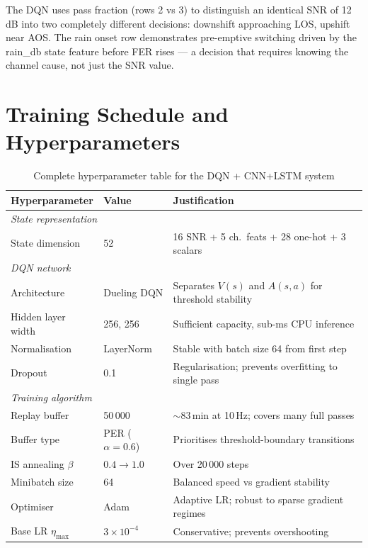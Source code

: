 \documentclass[12pt,a4paper]{report}
\begin{document}
The DQN uses pass fraction (rows 2 vs 3) to distinguish an identical
SNR of 12\,dB into two completely different decisions: downshift approaching
LOS, upshift near AOS. The rain onset row demonstrates pre-emptive switching
driven by the rain\_db state feature before FER rises --- a decision that
requires knowing the channel cause, not just the SNR value.

\section{Training Schedule and Hyperparameters}

\begin{table}[H]
\centering
\caption{Complete hyperparameter table for the DQN + CNN+LSTM system}
\label{tab:hyper}
\begin{tabular}{lll}
\toprule
\textbf{Hyperparameter} & \textbf{Value} & \textbf{Justification} \\
\midrule
\multicolumn{3}{l}{\textit{State representation}} \\
State dimension         & 52              & 16 SNR + 5 ch.\ feats + 28 one-hot + 3 scalars \\
\midrule
\multicolumn{3}{l}{\textit{DQN network}} \\
Architecture            & Dueling DQN     & Separates $V(s)$ and $A(s,a)$ for threshold stability \\
Hidden layer width      & 256, 256        & Sufficient capacity, sub-ms CPU inference \\
Normalisation           & LayerNorm       & Stable with batch size 64 from first step \\
Dropout                 & 0.1             & Regularisation; prevents overfitting to single pass \\
\midrule
\multicolumn{3}{l}{\textit{Training algorithm}} \\
Replay buffer           & 50\,000         & $\sim$83\,min at 10\,Hz; covers many full passes \\
Buffer type             & PER ($\alpha=0.6$) & Prioritises threshold-boundary transitions \\
IS annealing $\beta$    & $0.4 \to 1.0$  & Over 20\,000 steps \\
Minibatch size          & 64              & Balanced speed vs gradient stability \\
Optimiser               & Adam            & Adaptive LR; robust to sparse gradient regimes \\
Base LR $\eta_\text{max}$ & $3\times10^{-4}$ & Conservative; prevents overshooting \\

\end{tabular}
\end{table}
\end{document}
